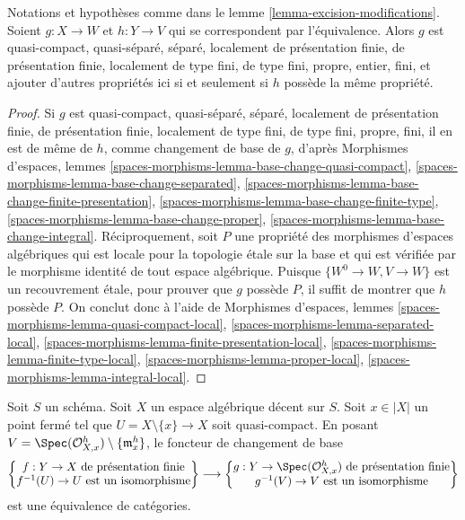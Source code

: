 \begin{lemma}
\label{lemma-excision-modifications-properties}
Notations et hypothèses comme dans le lemme \ref{lemma-excision-modifications}.
Soient $g : X \to W$ et $h : Y \to V$ qui se correspondent par l'équivalence.
Alors $g$ est quasi-compact, quasi-séparé, séparé, localement de présentation
finie, de présentation finie, localement de type fini, de type fini,
propre, entier, fini, et ajouter d'autres propriétés ici si et seulement si
$h$ possède la même propriété.
\end{lemma}

\begin{proof}
Si $g$ est quasi-compact, quasi-séparé, séparé, localement de présentation
finie, de présentation finie, localement de type fini, de type fini,
propre, fini, il en est de même de $h$, comme changement de base de $g$, d'après
Morphismes d'espaces, lemmes
\ref{spaces-morphisms-lemma-base-change-quasi-compact},
\ref{spaces-morphisms-lemma-base-change-separated},
\ref{spaces-morphisms-lemma-base-change-finite-presentation},
\ref{spaces-morphisms-lemma-base-change-finite-type},
\ref{spaces-morphisms-lemma-base-change-proper},
\ref{spaces-morphisms-lemma-base-change-integral}.
Réciproquement, soit $P$ une propriété des morphismes d'espaces
algébriques qui est locale pour la topologie \'etale sur la base et qui est vérifiée par
le morphisme identité de tout espace algébrique.
Puisque $\{W^0 \to W, V \to W\}$ est un recouvrement \'etale,
pour prouver que $g$ possède $P$, il suffit de montrer
que $h$ possède $P$. On conclut donc à l'aide de
Morphismes d'espaces, lemmes
\ref{spaces-morphisms-lemma-quasi-compact-local},
\ref{spaces-morphisms-lemma-separated-local},
\ref{spaces-morphisms-lemma-finite-presentation-local},
\ref{spaces-morphisms-lemma-finite-type-local},
\ref{spaces-morphisms-lemma-proper-local},
\ref{spaces-morphisms-lemma-integral-local}.
\end{proof}

\begin{lemma}
\label{lemma-modifications}
Soit $S$ un schéma. Soit $X$ un espace algébrique décent sur $S$.
Soit $x \in |X|$ un point fermé tel que $U = X \setminus \{x\} \to X$
soit quasi-compact. En posant
$V = \Spec(\mathcal{O}_{X, x}^h) \setminus \{\mathfrak m_x^h\}$,
le foncteur de changement de base
$$
\left\{
\begin{matrix}
f : Y \to X\text{ de présentation finie} \\
f^{-1}(U) \to U\text{ est un isomorphisme}
\end{matrix}
\right\}
\longrightarrow
\left\{
\begin{matrix}
g : Y \to \Spec(\mathcal{O}_{X, x}^h)\text{ de présentation finie} \\
g^{-1}(V) \to V\text{ est un isomorphisme}
\end{matrix}
\right\}
$$
est une équivalence de catégories.
\end{lemma}

